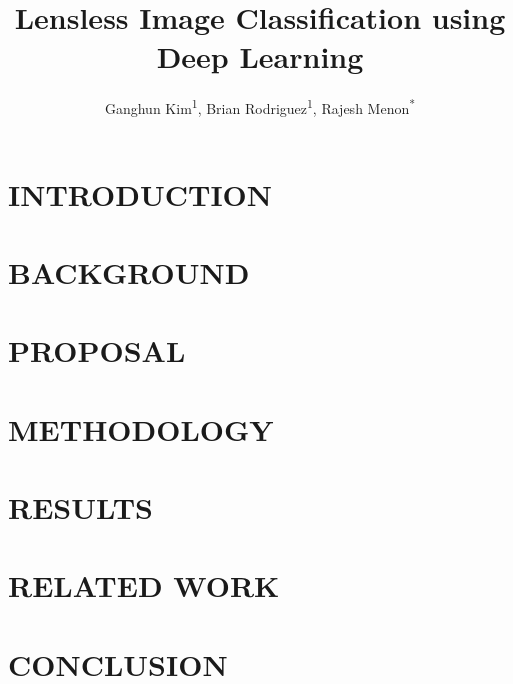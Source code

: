 \documentclass[12pt,conference]{ieeeconf}
\begin{document}
\title{Lensless Image Classification using Deep Learning}
\author{Ganghun Kim\textsuperscript{1}, Brian Rodriguez\textsuperscript{1}, Rajesh Menon\textsuperscript{*}}
\maketitle

\abstract

\section{INTRODUCTION}

\section{BACKGROUND}

\section{PROPOSAL}

\section{METHODOLOGY}

\section{RESULTS}

\section{RELATED WORK}

\section{CONCLUSION}
\end{document}

